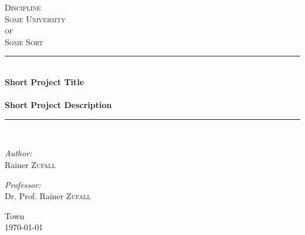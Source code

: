\begin{titlepage}

\begin{center}

\textsc{\LARGE Discipline}\\[1.5cm]

\textsc{\Large Some University\\ of\\ Some Sort}\\[0.5cm]

\vfill{}

\newcommand{\HRule}{\rule{\linewidth}{0.5mm}}
\HRule \\[0.4cm]
{   \Huge \bfseries Short Project Title\\
        ~\\
        \large Short Project Description}\\[0.4cm]

\HRule \\[1.5cm]

\begin{minipage}{0.4\textwidth}
    \begin{flushleft} \large
        \emph{Author:}\\
        Rainer \textsc{Zufall}\\
    \end{flushleft}
\end{minipage}
\hfill
\begin{minipage}{0.4\textwidth}
    \begin{flushright} \large
        \emph{Professor:} \\
        Dr. Prof. Rainer \textsc{Zufall} \\
    \end{flushright}
\end{minipage}

\vfill{}
\vfill{}
\vfill{}

{\large Town\\ \today}

\end{center}

\end{titlepage}
